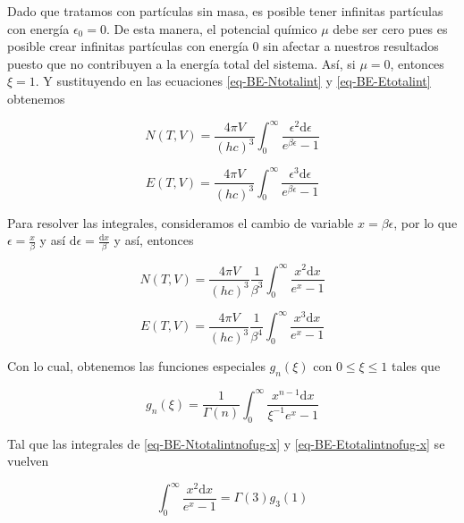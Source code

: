 Dado que tratamos con partículas sin masa, es posible tener infinitas partículas con energía ${\epsilon}_{0}=0$. De esta manera, el potencial químico $\mu$ debe ser cero pues es posible crear infinitas partículas con energía $0$ sin afectar a nuestros resultados puesto que no contribuyen a la energía total del sistema. Así, si $\mu=0$, entonces $\xi = 1$. Y sustituyendo en las ecuaciones \eqref{eq-BE-Ntotalint} y \eqref{eq-BE-Etotalint} obtenemos 

\begin{equation}\label{eq-BE-Ntotalintnofug}
N(T,V) = \frac{4\pi V}{(hc)^{3}} \int_{0}^{\infty} \frac{{\epsilon}^{2} \mathrm{d} \epsilon}{{e}^{\beta \epsilon} - 1}
\end{equation}

\begin{equation}\label{eq-BE-Etotalintnofug}
E(T,V) = \frac{4\pi V}{(hc)^{3}} \int_{0}^{\infty} \frac{{\epsilon}^{3} \mathrm{d} \epsilon}{ {e}^{\beta \epsilon} - 1}
\end{equation}

Para resolver las integrales, consideramos el cambio de variable $x=\beta \epsilon$, por lo que $\epsilon = \frac{x}{\beta}$ y así $\mathrm{d}\epsilon = \frac{\mathrm{d}x}{\beta}$ y así, entonces 

\begin{equation}\label{eq-BE-Ntotalintnofug-x}
N(T,V) = \frac{4\pi V}{(hc)^{3}} \frac{1}{{\beta}^{3}}\int_{0}^{\infty} \frac{{x}^{2} \mathrm{d} x}{{e}^{x} - 1}
\end{equation}

\begin{equation}\label{eq-BE-Etotalintnofug-x}
E(T,V) = \frac{4\pi V}{(hc)^{3}} \frac{1}{{\beta}^{4}} \int_{0}^{\infty} \frac{{x}^{3} \mathrm{d} x}{ {e}^{x} - 1}
\end{equation}

Con lo cual, obtenemos las funciones especiales ${g}_{n}(\xi)$ con $0 \leq \xi \leq 1$ tales que

\begin{equation}\label{eq-g-xi}
{g}_{n}(\xi) = \frac{1}{\Gamma(n)} \int_{0}^{\infty} \frac{{x}^{n-1} \mathrm{d}x}{{\xi}^{-1}{e}^{x}-1}
\end{equation}

Tal que las integrales de \eqref{eq-BE-Ntotalintnofug-x} y \eqref{eq-BE-Etotalintnofug-x} se vuelven

\begin{equation}\label{eq-sol-int-N}
\int_{0}^{\infty} \frac{{x}^{2} \mathrm{d} x}{ {e}^{x} - 1} = \Gamma(3) {g}_{3}(1)
\end{equation}


